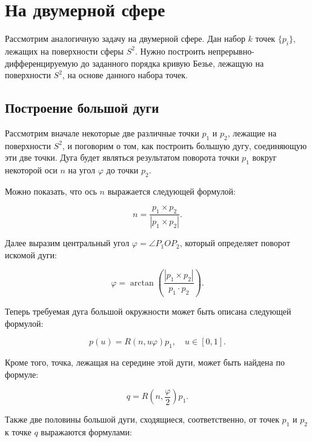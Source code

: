 \section{На двумерной сфере}

Рассмотрим аналогичную задачу на двумерной сфере. Дан набор $k$ точек $\{p_i\}$, лежащих на поверхности сферы $S^2$.
Нужно построить непрерывно-дифференци\-руемую до заданного порядка кривую Безье, лежащую на поверхности $S^2$, на
основе данного набора точек.

\subsection*{Построение большой дуги}

Рассмотрим вначале некоторые две различные точки $p_1$ и $p_2$, лежащие на поверхности $S^2$, и поговорим о том, как
построить большую дугу, соединяющую эти две точки. Дуга будет являться результатом поворота точки $p_1$ вокруг
некоторой оси $n$ на угол $\varphi$ до точки $p_2$.

Можно показать, что ось $n$ выражается следующей формулой:

\begin{equation}
n=\frac{p_1\times p_2}{|p_1\times p_2|}.
\label{two-dimension-sphere-bezier-axis}
\end{equation}

Далее выразим центральный угол $\varphi=\angle P_1OP_2$, который определяет поворот искомой дуги:

\begin{equation}
\varphi=\arctan\left(\frac{|p_1\times p_2|}{p_1\cdot p_2}\right).
\label{two-dimension-sphere-bezier-angle}
\end{equation}

Теперь требуемая дуга большой окружности может быть описана следующей формулой:

\begin{equation}
p(u)=R(n,u\varphi)p_1, \quad u \in [0,1].
\label{two-dimension-big-arc}
\end{equation}

Кроме того, точка, лежащая на середине этой дуги, может быть найдена по формуле:

\begin{equation}
q=R(n,\frac{\varphi}{2})p_1.
\label{two-dimension-big-arc-mid}
\end{equation}

Также две половины большой дуги, сходящиеся, соответственно, от точек $p_1$ и $p_2$ к точке $q$ выражаются формулами:

